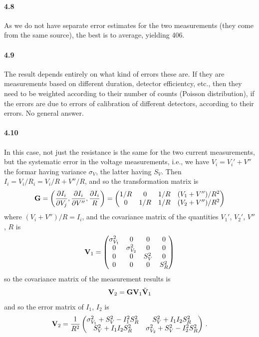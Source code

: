 \documentclass[a4paper,12pt]{article}
\begin{document}
\paragraph{4.8} As we do not have separate error estimates for the two measurements (they come from the same source), the best is to average, yielding 406.

\paragraph{4.9} The result depends entirely on what kind of errors these are. If they are measurements based on different duration, detector efficientcy, etc., then they need to be weighted according to their number of counts (Poisson distribution), if the errors are due to errors of calibration of different detectors, according to their errors. No general answer.

\paragraph{4.10} In this case, not just the resistance is the same for the two current measurements, but the systematic error in the voltage measurements, i.e., we have $V_i = V_i' + V''$ the formar having variance $\sigma_V$, the latter having $S_V$. Then $I_i = V_i/R_i = V_i/R + V''/R$, and so the transformation matrix is
\[
 {\bf G} = \left( \frac{\partial I_i}{\partial V_j}, \frac{\partial I_i}{\partial V''}, \frac{\partial I_i}{R} \right) =
 \begin{pmatrix}
  1/R & 0   & 1/R & (V_1 + V'')/R^2 \\
  0   & 1/R & 1/R & (V_2 + V'')/R^2
 \end{pmatrix}
\]
where $(V_i + V'')/R = I_i$,
and the covariance matrix of the quantities $V_1'$, $V_2'$, $V''$, $R$ is
\[
{\bf V}_1 =
 \begin{pmatrix}
  \sigma_{V_1}^2 & 0 & 0 & 0 \\
  0 & \sigma_{V_2}^2 & 0 & 0 \\
  0 & 0 & S_V^2 & 0 \\
  0 & 0 & 0 & S_R^2
 \end{pmatrix}
\]
so the covariance matrix of the measurement results is
\[
 {\bf V}_2 = {\bf G} {\bf V}_1 \tilde{\bf V}_1
\]
and so %
the error matrix of $I_1$, $I_2$ is
\[
 {\bf V}_2 = \frac{1}{R^2}
 \begin{pmatrix}
  \sigma_{V_1}^2 + S_V^2 - I_1^2 S_R^2 & S_V^2 + I_1 I_2 S_R^2\\
  S_V^2 + I_1 I_2 S_R^2 & \sigma_{V_2}^2 + S_V^2 - I_2^2 S_R^2
 \end{pmatrix}\,.
\]
\end{document}
